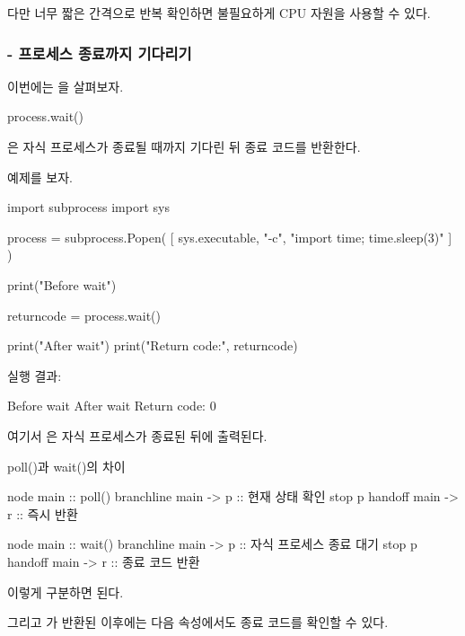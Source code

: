 다만 너무 짧은 간격으로 반복 확인하면 불필요하게 CPU 자원을 사용할 수 있다.

\subsubsection{ - 프로세스 종료까지 기다리기}

이번에는 을 살펴보자.

\begin{dhkzsh}
process.wait()
\end{dhkzsh}

은 자식 프로세스가 종료될 때까지 기다린 뒤 종료 코드를 반환한다.

예제를 보자.

\begin{dhkcode}
import subprocess
import sys

process = subprocess.Popen(
    [
        sys.executable,
        "-c",
        "import time; time.sleep(3)"
    ]
)

print("Before wait")

returncode = process.wait()

print("After wait")
print("Return code:", returncode)
\end{dhkcode}

실행 결과:

\begin{dhkzsh}
Before wait
After wait
Return code: 0
\end{dhkzsh}

여기서 은 자식 프로세스가 종료된 뒤에 출력된다.

\begin{dhknote}
\begin{dhksmry}[centered]
poll()과 wait()의 차이
\end{dhksmry}
\end{dhknote}

\begin{dhkbranch}
node main :: poll()
branchline main -> p :: 현재 상태 확인
stop p
handoff main -> r :: 즉시 반환
\end{dhkbranch}

\begin{dhkbranch}
node main :: wait()
branchline main -> p :: 자식 프로세스 종료 대기
stop p
handoff main -> r :: 종료 코드 반환
\end{dhkbranch}

이렇게 구분하면 된다.

그리고 가 반환된 이후에는 다음 속성에서도 종료 코드를 확인할 수 있다.

